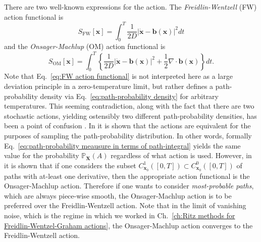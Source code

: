 There are two well-known expressions for the action. The \textit{Freidlin-Wentzell} (FW) action functional is \citep{adibStochasticActionsDiffusive2008, ventselSMALLRANDOMPERTURBATIONS1970, touchetteLargeDeviationApproach2009, grafkeNumericalComputationRare2019}
\begin{equation} \label{eq:FW action functional}
S_\text{FW}[\mathbf{x}] = \int_0^T \frac{1}{2 D} |\dot{\mathbf{x}} - \mathbf{b}(\mathbf{x})|^2 dt
\end{equation}
and the \textit{Onsager-Machlup} (OM) action functional is \citep{adibStochasticActionsDiffusive2008, durrOnsagerMachlupFunctionLagrangian1978a, stratonovichProbabilityFunctionalDiffusion1971, fujitaOnsagerMachlupFunctionDiffusion1982, onsagerFluctuationsIrreversibleProcesses1953, bachFunctionalsPathsDiffusion1977, horsthemkeOnsagerMachlupFunctionOne1975}
\begin{equation} \label{eq:OM action functional}
S_\text{OM}[\mathbf{x}] = \int_0^T \left\{ \frac{1}{2 D} |\dot{\mathbf{x}} - \mathbf{b}(\mathbf{x})|^2 + \frac{1}{2} \nabla \cdot \mathbf{b}(\mathbf{x}) \right\} dt.
\end{equation}
Note that Eq.~\ref{eq:FW action functional} is not interpreted here as a large deviation principle in a zero-temperature limit, but rather defines a path-probability density via Eq.~\ref{eq:path-probability density} for arbitrary temperatures. This seeming contradiction, along with the fact that there are two stochastic actions, yielding ostensibly two different path-probability densities, has been a point of confusion \citep{adibStochasticActionsDiffusive2008, gladrowExperimentalMeasurementRelative2021}.  In \citep{adibStochasticActionsDiffusive2008} it is shown that the actions are equivalent for the purposes of sampling the path-probability distribution. In other words, formally Eq.~\ref{eq:path-probability meausure in terms of path-integral} yields the same value for the probability $\mathbb{P}_\mathbf{X}(A)$ regardless of what action is used. However, in \citep{gladrowExperimentalMeasurementRelative2021} it is shown that if one considers the subset $C^1_{\mathbf{x}_0}([0,T]) \subset C^0_{\mathbf{x}_0}([0,T])$ of paths with at-least one derivative, then the appropriate action functional is the Onsager-Machlup action. Therefore if one wants to consider \textit{most-probable paths}, which are always piece-wise smooth, the Onsager-Machlup action is to be preferred over the Freidlin-Wentzell action. Note that in the limit of vanishing noise, which is the regime in which we worked in Ch.~\ref{ch:Ritz methods for Freidlin-Wentzel-Graham actions}, the Onsager-Machlup action converges to the Freidlin-Wentzell action. 
 
